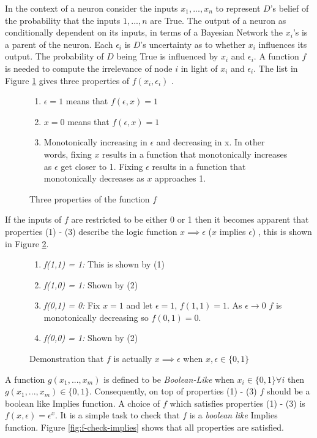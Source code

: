 In the context of a neuron consider the inputs $x_1, ..., x_n$ to represent $D$'s belief of the probability that the inputs $1, ..., n$ are True. The output of a neuron as conditionally dependent on its inputs, in terms of a Bayesian Network the $x_i$'s is a parent of the neuron. Each $\epsilon_i$ is $D$'s uncertainty as to whether $x_i$ influences its output. The probability of $D$ being True is influenced by $x_i$ and $\epsilon_i$. A function $f$ is needed to compute the irrelevance of node $i$ in light of $x_i$ and $\epsilon_i$. The list in Figure \ref{fig:irelevence-function-cond} gives three properties of $f(x_i, \epsilon_i)$ \cite{LearningLogicalActivations}.\\

\begin{figure}[H]
\begin{enumerate}
	\item $\epsilon = 1$ means that $f(\epsilon, x) = 1$
	\item $x = 0$ means that $f(\epsilon, x) = 1$
	\item Monotonically increasing in $\epsilon$ and decreasing in x. In other words, fixing $x$ results in a function that monotonically increases as $\epsilon$ get closer to 1. Fixing $\epsilon$ results in a function that monotonically decreases as $x$ approaches 1.
\end{enumerate}
\caption{Three properties of the function $f$}
\label{fig:irelevence-function-cond}
\end{figure}

If the inputs of $f$ are restricted to be either 0 or 1 then it becomes apparent that properties (1) - (3) describe the logic function $x \implies \epsilon$ ($x$ implies $\epsilon$) , this is shown in Figure \ref{fig:f-actually-implies}. 

\begin{figure}[H]
\begin{enumerate}
\item \textit{f(1,1) = 1:} This is shown by (1)
\item \textit{f(1,0) = 1:} Shown by (2)
\item \textit{f(0,1) = 0:} Fix $x = 1$ and let $\epsilon = 1$, $f(1,1) = 1$. As $\epsilon \rightarrow 0 $ $f$ is monotonically decreasing so $f(0,1) = 0$.
\item \textit{f(0,0) = 1:} Shown by (2)
\end{enumerate}
\caption{Demonstration that $f$ is actually $x \implies \epsilon$ when $x,\epsilon \in \{0, 1\}$}
\label{fig:f-actually-implies}
\end{figure}
A function $g(x_1, ..., x_m)$ is defined to be \textit{Boolean-Like} \cite{williams1986logic} when $x_i \in \{0, 1\} \forall i$ then $g(x_1, ..., x_m) \in \{0, 1\}$. Consequently, on top of properties (1) - (3) $f$ should be a boolean like Implies function. A choice of $f$ which satisfies properties (1) - (3) is $f(x, \epsilon) = \epsilon^x$. It is a simple task to check that $f$ is a \textit{boolean like} Implies function. Figure \ref{fig:f-check-implies} shows that all properties are satisfied.


